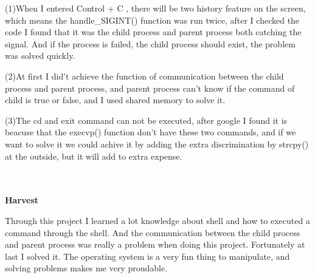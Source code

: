 \documentclass[12pt,a4paper]{article}
\begin{document}
(1)When I entered Control + C , there will be two history feature on the screen, which means the handle\_SIGINT() function was run twice, after I checked the code I found that it was the child process and parent process both catching the signal. And if the process is failed, the child process should exist, the problem was solved quickly.

(2)At first I did't achieve the function of communication between the child process and parent process, and  parent process can't know if the command of child is true or false, and I used shared memory to solve it. 

(3)The cd and exit command can not be executed, after google I  found it is beacuse that the execvp() function don't have these two commands, and if we want to solve it we could achive it by adding the extra discrimination  by strcpy() at the outside, but it will add to extra expense.
\begin{large}
~\\
~\\
\textbf{Harvest}
\end{large}

Through this project I learned a lot knowledge about shell and how to executed a command through the shell.  And the communication between the child process and parent process was really a problem when doing this project. Fortunately at last I solved it. The operating system is a very fun thing to manipulate, and solving problems makes me very proudable.
\end{document}
